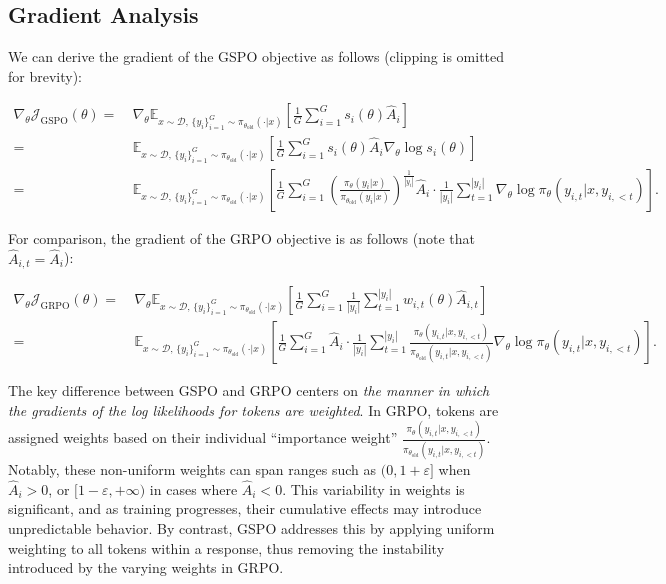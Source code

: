 \subsection{Gradient Analysis}
\label{subsec:gradient}

We can derive the gradient of the GSPO objective as follows (clipping is omitted for brevity):

\begin{align}
\nabla_{\theta} \mathcal{J}_\text{GSPO} (\theta)
=&\ 
\nabla_{\theta} \mathbb{E}_{ x \sim \mathcal{D},\, \{y_i\}_{i=1}^G \sim \pi_{\theta_\text{old}}( \cdot | x) }
\left[ 
\frac{1}{G} \sum_{i=1}^{G} s_{i}(\theta) \widehat{A}_{i}
\right] \\
= &\ 
\mathbb{E}_{ x \sim \mathcal{D},\, \{y_i\}_{i=1}^G \sim \pi_{\theta_\text{old}}( \cdot | x) }
\left[ 
\frac{1}{G} \sum_{i=1}^{G}
s_{i}(\theta) \widehat{A}_{i}
\nabla_{\theta} \log s_{i}(\theta)
\right] \\
=&\ 
\mathbb{E}_{ x \sim \mathcal{D},\, \{y_i\}_{i=1}^G \sim \pi_{\theta_\text{old}}( \cdot | x) }
\left[ 
\frac{1}{G} \sum_{i=1}^{G} 
\left( \frac{ \pi_{\theta} (y_i | x) }{ \pi_{\theta_\text{old}} (y_i | x)} \right)^{\frac{1}{|y_i|}} \widehat{A}_{i} 
\cdot \frac{1}{|y_i|} \sum_{t=1}^{|y_i|} \nabla_{\theta} \log \pi_{\theta} (y_{i,t} | x, y_{i,<t}) 
\right].
\label{equ:gspo_grad}
\end{align}

For comparison, the gradient of the GRPO objective is as follows (note that $\widehat{A}_{i,t} = \widehat{A}_{i}$):

\begin{align}
\nabla_{\theta} \mathcal{J}_\text{GRPO} (\theta)
=&\
\nabla_{\theta} \mathbb{E}_{ x \sim \mathcal{D},\, \{y_i\}_{i=1}^G \sim \pi_{\theta_\text{old}}( \cdot | x) }
\left[ \frac{1}{G} \sum_{i=1}^{G} \frac{1}{|y_i|} \sum_{t=1}^{|y_i|}
w_{i,t}(\theta) \widehat{A}_{i,t}
\right] \\
=&\
\mathbb{E}_{ x \sim \mathcal{D},\, \{y_i\}_{i=1}^G \sim \pi_{\theta_\text{old}}( \cdot | x) }
\left[
\frac{1}{G} \sum_{i=1}^{G} \widehat{A}_i
\cdot \frac{1}{|y_i|} \sum_{t=1}^{|y_i|}
\frac{ \pi_{\theta} (y_{i,t} | x, y_{i,<t}) }{ \pi_{\theta_\text{old}} (y_{i,t} | x, y_{i,<t})}
\nabla_{\theta} \log \pi_{\theta} (y_{i,t} | x, y_{i,<t})
\right].
\end{align}

The key difference between GSPO and GRPO centers on \textit{the manner in which the gradients of the log likelihoods for tokens are weighted}. In GRPO, tokens are assigned weights based on their individual ``importance weight'' $\frac{ \pi_{\theta} (y_{i,t} | x, y_{i,<t}) }{ \pi_{\theta_\text{old}} (y_{i,t} | x,y_{i,<t})}$. Notably, these non-uniform weights can span ranges such as $(0, 1+\varepsilon]$ when $\widehat{A}_{i} >0$, or $[1-\varepsilon, +\infty)$ in cases where $\widehat{A}_{i} < 0$. This variability in weights is significant, and as training progresses, their cumulative effects may introduce unpredictable behavior. By contrast, GSPO addresses this by applying uniform weighting to all tokens within a response, thus removing the instability introduced by the varying weights in GRPO.

